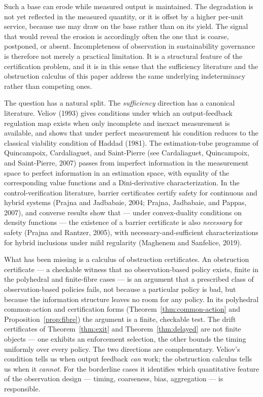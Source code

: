 \documentclass[11pt]{article}
\theoremstyle{definition}
\begin{document}
Such a base can erode while measured output is maintained. The
degradation is not yet reflected in the measured quantity, or it is
offset by a higher per-unit service, because use may draw on the base
rather than on its yield. The signal that would reveal the erosion is
accordingly often the one that is coarse, postponed, or absent.
Incompleteness of observation in sustainability governance is therefore
not merely a practical limitation. It is a structural feature of the
certification problem, and it is in this sense that the sufficiency
literature and the obstruction calculus of this paper address the same underlying indeterminacy rather than competing ones.

The question has a natural split. The \emph{sufficiency} direction has a
canonical literature. Veliov (1993) gives conditions under which an
output-feedback regulation map exists when only incomplete and inexact
measurement is available, and shows that under perfect measurement his
condition reduces to the classical viability condition of Haddad (1981).
The estimation-tube programme of Quincampoix, Cardaliaguet, and
Saint-Pierre (see Cardaliaguet, Quincampoix, and Saint-Pierre, 2007)
passes from imperfect information in the measurement space to perfect
information in an estimation space, with equality of the corresponding
value functions and a Dini-derivative characterization. In the
control-verification literature, barrier certificates certify safety for
continuous and hybrid systems (Prajna and Jadbabaie, 2004; Prajna,
Jadbabaie, and Pappas, 2007), and converse results show that --- under
convex-duality conditions on density functions --- the existence of a
barrier certificate is also \emph{necessary} for safety (Prajna and
Rantzer, 2005), with necessary-and-sufficient characterizations for
hybrid inclusions under mild regularity (Maghenem and Sanfelice, 2019).

What has been missing is a calculus of obstruction certificates. An obstruction certificate --- a checkable witness that no observation-based policy exists, finite in the polyhedral and finite-fibre cases --- is an argument that a prescribed class of observation-based policies fails, not because a particular policy is bad, but because the information structure leaves no room for any policy. In its polyhedral common-action and certification forms
(Theorem~\ref{thm:common-action} and Proposition~\ref{prop:fibre}) the argument is a finite, checkable test. The drift
certificates of Theorem~\ref{thm:exit} and Theorem~\ref{thm:delayed} are not finite objects --- one exhibits
an enforcement selection, the other bounds the timing uniformly over every policy. The two directions are
complementary. Veliov's condition tells us when output feedback
\emph{can} work; the obstruction calculus tells us when it
\emph{cannot}. For the borderline cases it identifies which quantitative
feature of the observation design --- timing, coarseness, bias,
aggregation --- is responsible.
\end{document}
